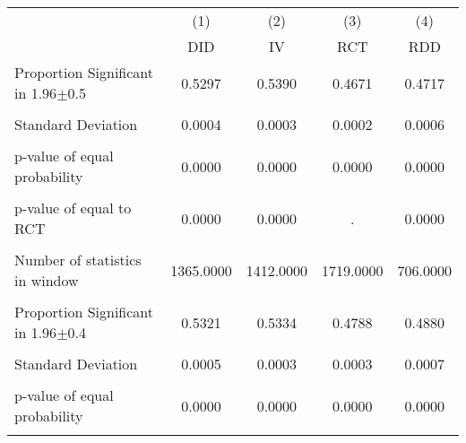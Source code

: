 {
\def\sym#1{\ifmmode^{#1}\else\(^{#1}\)\fi}
\begin{tabular}{l*{4}{c}}
\hline\hline
                &\multicolumn{1}{c}{(1)}&\multicolumn{1}{c}{(2)}&\multicolumn{1}{c}{(3)}&\multicolumn{1}{c}{(4)}\\
                &\multicolumn{1}{c}{DID}&\multicolumn{1}{c}{IV}&\multicolumn{1}{c}{RCT}&\multicolumn{1}{c}{RDD}\\
\hline
\hline Proportion Significant in 1.96$\pm$0.5&   0.5297         &   0.5390         &   0.4671         &   0.4717         \\
                &                  &                  &                  &                  \\
Standard Deviation&   0.0004         &   0.0003         &   0.0002         &   0.0006         \\
                &                  &                  &                  &                  \\
p-value of equal probability&   0.0000         &   0.0000         &   0.0000         &   0.0000         \\
                &                  &                  &                  &                  \\
p-value of equal to RCT&   0.0000         &   0.0000         &        .         &   0.0000         \\
                &                  &                  &                  &                  \\
Number of statistics in window&1365.0000         &1412.0000         &1719.0000         & 706.0000         \\
                &                  &                  &                  &                  \\
\hline Proportion Significant in 1.96$\pm$0.4&   0.5321         &   0.5334         &   0.4788         &   0.4880         \\
                &                  &                  &                  &                  \\
Standard Deviation&   0.0005         &   0.0003         &   0.0003         &   0.0007         \\
                &                  &                  &                  &                  \\
p-value of equal probability&   0.0000         &   0.0000         &   0.0000         &   0.0000         \\
                &                  &                  &                  &                  \\

\end{tabular}}

